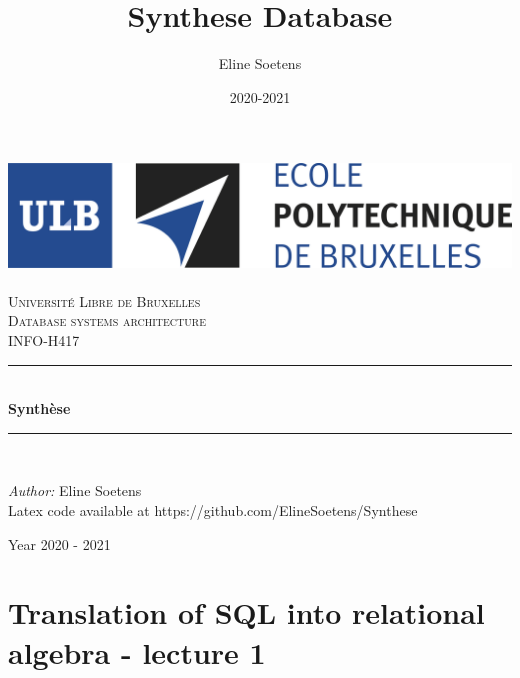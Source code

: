 \documentclass[12pt,a4paper]{article}
\title{Synthese Database}
\author{Eline Soetens}
\date{2020-2021}
\begin{document}
\begin{titlepage}
\begin{center}	
	\newcommand{\HRule}{\rule{\linewidth}{0.5mm}}  
	\includegraphics[scale=0.6]{img/logo.jpg}~\\[2cm]

	\textsc{\LARGE Université Libre de Bruxelles}\\[2cm]
	\textsc{\LARGE Database systems architecture}\\[0.5cm]
	\textsc{\LARGE INFO-H417}\\[1.5cm]
	
	\HRule \\[0.4cm]
	{ \huge \bfseries Synthèse \\[0.4cm] }


	\HRule \\[2cm]
		\begin{minipage}{0.5\textwidth}
		
		
		\begin{flushleft} 
		\hspace{0.25cm}
		    \textit{Author:} Eline Soetens \\\hspace{0.25 cm}
		    Latex code available at https://github.com/ElineSoetens/Synthese
		\end{flushleft}
		\end{minipage}
			\begin{minipage}{1.5\textwidth}
			
		\end{minipage}

	\vfill

{\large Year 2020 - 2021}

\end{center}
\end{titlepage}
\newpage

\tableofcontents
\newpage
\section{Translation of SQL into relational algebra - lecture 1}
\end{document}
